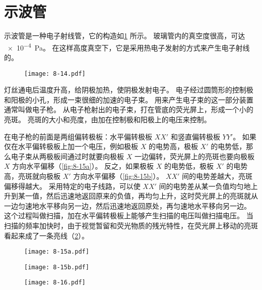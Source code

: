 \section{示波管}
示波管是一种电子射线管，它的构造如\cref{fig:8-14} 所示。
玻璃管内的真空度很高，可达 \qty{e-4}{Pa}。
在这样高度真空下，它是采用热电子发射的方式来产生电子射线的。
\begin{figure}
  \texttt{[image: 8-14.pdf]}
  \caption{}\label{fig:8-14}
\end{figure}

灯丝通电后温度升高，给阴极加热，使阴极发射电子。
电子经过圆筒形的控制极和阳极的小孔，形成一束很细的加速的电子束。
用来产生电子束的这一部分装置通常叫做电子枪。
从电子枪射出的电子束，打在管底的荧光屏上，形成一个小的亮斑。
亮斑的大小和亮度，由加在控制极和阳极上的电压来控制。

在电子枪的前面是两组偏转极板：水平偏转极板 $XX'$ 和竖直偏转极板 $YY'$。
如果仅在水平偏转极板上加一个电压，例如极板 $X$ 的电势高，极板 $X'$ 的电势低，那么电子束从两极板间通过时就要向极板 $X$ 一边偏转，荧光屏上的亮斑也要向极板 $X$ 方向水平偏移（\cref{fig:8-15a}）。
反之，如果极板 $X$ 的电势低，极板 $X'$ 的电势高，亮斑就向极板 $X'$ 方向水平偏移（\cref{fig:8-15b}）。
$XX'$ 间的电势差越大，亮斑偏移得越大。
采用特定的电子线路，可以使 $XX'$ 间的电势差从某一负值均匀地上升到某一值，然后迅速地返回原来的负值，再均匀上升，这时荧光屏上的亮斑就从一边匀速地水平移向另一边，然后迅速地返回原处，再匀速地水平移向另一边。
这个过程叫做扫描，加在水平偏转极板上能够产生扫描的电压叫做扫描电压。
当扫描的频率加快时，由于视觉暂留和荧光物质的残光特性，在荧光屏上移动的亮斑看起来成了一条亮线（\cref{fig:8-16}）。
\begin{figure}
  \begin{minipage}[b]{0.6\linewidth}\centering
    \begin{minipage}{0.5\linewidth}\raggedleft
      \texttt{[image: 8-15a.pdf]}
      \subcaption{}\label{fig:8-15a}
    \end{minipage}%
    \begin{minipage}{0.5\linewidth}\raggedright
      \texttt{[image: 8-15b.pdf]}
      \subcaption{}\label{fig:8-15b}
    \end{minipage}
    \caption{}\label{fig:8-15}
  \end{minipage}
  \begin{minipage}[b]{0.38\linewidth}\centering
    \texttt{[image: 8-16.pdf]}
    \caption{}\label{fig:8-16}
  \end{minipage}
\end{figure}

